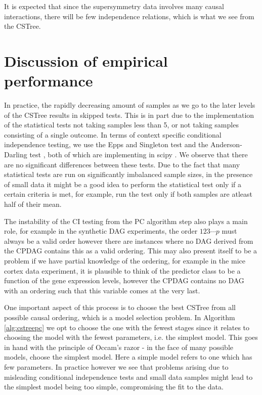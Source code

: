 \documentclass{tufte-book}
\begin{document}
It is expected that since the supersymmetry data involves many causal interactions, there will be few independence relations, which is what we see from the CSTree.


\section{Discussion of empirical performance}
\label{sec:org3b01116}

In practice, the rapidly decreasing amount of samples as we go to the later levels of the CSTree results in skipped tests. This is in part due to the implementation of the statistical tests not taking samples less than 5, or not taking samples consisting of a single outcome. In terms of context specific conditional independence testing, we use the Epps and Singleton test \cite{epps-1986-omnib-test} and the Anderson-Darling test \cite{scholz-1987-k-sampl}, both of which are implementing in scipy \cite{virtanen-2020-scipy}. We observe that there are no significant differences between these tests. Due to the fact that many statistical tests are run on significantly imbalanced sample sizes, in the presence of small data it might be a good idea to perform the statistical test only if a certain criteria is met, for example, run the test only if both samples are atleast half of their mean. 


The instability of the CI testing from the PC algorithm step also plays a main role, for example in the synthetic DAG experiments, the order \(123\cdots p\) must always be a valid order however there are instances where no DAG derived from the CPDAG contains this as a valid ordering. This may also present itself to be a problem if we have partial knowledge of the ordering, for example in the mice cortex data experiment, it is plausible to think of the predictor class to be a function of the gene expression levels, however the CPDAG contains no DAG with an ordering such that this variable comes at the very last.


One important aspect of this process is to choose the best CSTree from all possible causal ordering, which is a model selection problem. In Algorithm \ref{alg:cstreepc} we opt to choose the one with the fewest stages since it relates to choosing the model with the fewest parameters, i.e. the simplest model. This goes in hand with the principle of Occam's razor - in the face of many possible models, choose the simplest model. Here a simple model refers to one which has few parameters. In practice however we see that problems arising due to misleading conditional independence tests and small data samples might lead to the simplest model being too simple, compromising the fit to the data.
\end{document}
